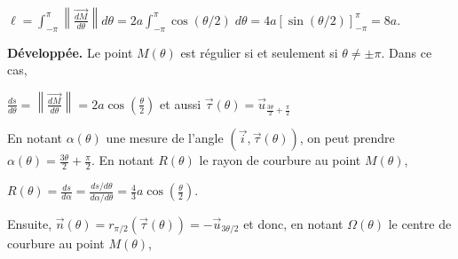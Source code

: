 {\begin{enumerate}
{\begin{center}
$\ell=\int_{-\pi}^{\pi}\left\|\overrightarrow{\frac{dM}{d\theta}}\right\|d\theta=2a\int_{-\pi}^{\pi}\cos(\theta/2)\;d\theta=4a\left[\sin(\theta/2)\right]_{-\pi}^\pi=8a$.
\end{center}

\begin{center}
\end{center}
\textbf{Développée.} Le point $M(\theta)$ est régulier si et seulement si $\theta\neq\pm\pi$. Dans ce cas, 

\begin{center}
$\frac{ds}{d\theta}=\left\|\overrightarrow{\frac{dM}{d\theta}}\right\|=2a\cos\left(\frac{\theta}{2}\right)$ et aussi $\overrightarrow{\tau}(\theta)=\overrightarrow{u}_{\frac{3\theta}{2}+\frac{\pi}{2}}$
\end{center}

En notant $\alpha(\theta)$ une mesure de l'angle $\left(\overrightarrow{i},\overrightarrow{\tau}(\theta)\right)$, on peut prendre $\alpha(\theta)=\frac{3\theta}{2}+\frac{\pi}{2}$. En notant $R(\theta)$ le rayon de courbure au point $M(\theta)$,

\begin{center}
$R(\theta)=\frac{ds}{d\alpha}=\frac{ds/d\theta}{d\alpha/d\theta}=\frac{4}{3}a\cos\left(\frac{\theta}{2}\right)$.
\end{center}
Ensuite, $\overrightarrow{n}(\theta)=r_{\pi/2}\left(\overrightarrow{\tau}(\theta)\right)=-\overrightarrow{u}_{3\theta/2}$ et donc, en notant $\Omega(\theta)$ le centre de courbure au point $M(\theta)$,

}
\end{enumerate}}

